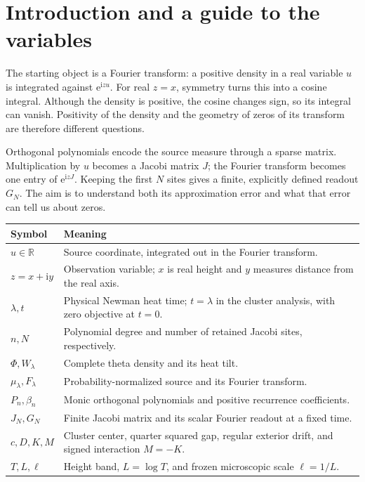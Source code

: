 \documentclass[11pt]{article}
\numberwithin{equation}{section}
\newcommand{\e}{\mathrm e}
\newcommand{\ii}{\mathrm i}
\newcommand{\R}{\mathbb R}
\begin{document}
\begingroup
\small
\tableofcontents
\endgroup

\section{Introduction and a guide to the variables}
\label{sec:introduction}

The starting object is a Fourier transform: a positive density in a
real variable \(u\) is integrated against \(\e^{\ii zu}\).
For real \(z=x\), symmetry turns this into a cosine integral.
Although the density is positive, the cosine changes sign, so its
integral can vanish. Positivity of the density and the geometry of
zeros of its transform are therefore different questions.

Orthogonal polynomials encode the source measure through a sparse
matrix. Multiplication by \(u\) becomes a Jacobi matrix \(J\); the
Fourier transform becomes one entry of \(\e^{\ii zJ}\).
Keeping the first \(N\) sites gives a finite, explicitly defined
readout \(G_N\). The aim is to understand both its approximation
error and what that error can tell us about zeros.

\begin{center}
\begin{tabular}{@{}p{}p{}@{}}
\toprule
Symbol & Meaning\\
\midrule
\(u\in\R\) & Source coordinate, integrated out in the Fourier transform.\\
\(z=x+\ii y\) & Observation variable; \(x\) is real height and \(y\) measures distance from the real axis.\\
\(\lambda,t\) & Physical Newman heat time; \(t=\lambda\) in the cluster analysis, with zero objective at \(t=0\).\\
\(n,N\) & Polynomial degree and number of retained Jacobi sites, respectively.\\
\(\Phi,W_\lambda\) & Complete theta density and its heat tilt.\\
\(\mu_\lambda,F_\lambda\) & Probability-normalized source and its Fourier transform.\\
\(P_n,\beta_n\) & Monic orthogonal polynomials and positive recurrence coefficients.\\
\(J_N,G_N\) & Finite Jacobi matrix and its scalar Fourier readout at a fixed time.\\
\(c,D,K,M\) & Cluster center, quarter squared gap, regular exterior drift, and signed interaction \(M=-K\).\\
\(T,L,\ell\) & Height band, \(L=\log T\), and frozen microscopic scale \(\ell=1/L\).\\
\bottomrule
\end{tabular}
\end{center}
\end{document}
